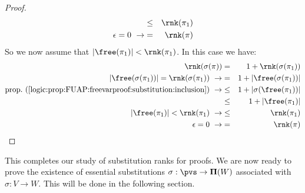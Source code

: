 \begin{proof}
\begin{eqnarray*}
    &\leq&\rnk(\pi_{1})\\
    \epsilon=0\ \rightarrow&=&\rnk(\pi)
    \end{eqnarray*}
So we now assume that $|\free(\pi_{1})|<\rnk(\pi_{1})$. In this case
we have:
    \begin{eqnarray*}
    \rnk(\sigma(\pi))&=&1+\rnk(\sigma(\pi_{1}))\\
    |\free(\sigma(\pi_{1}))|=\rnk(\sigma(\pi_{1}))\ \rightarrow
    &=&1+|\free(\sigma(\pi_{1}))|\\
    \mbox{prop.~(\ref{logic:prop:FUAP:freevarproof:substitution:inclusion})}\ \rightarrow
    &\leq&1+|\sigma(\free(\pi_{1}))|\\
    &\leq&1+|\free(\pi_{1})|\\
    |\free(\pi_{1})|<\rnk(\pi_{1})\ \rightarrow
    &\leq&\rnk(\pi_{1})\\
    \epsilon=0\ \rightarrow&=&\rnk(\pi)
    \end{eqnarray*}
\end{proof}

This completes our study of substitution ranks for proofs. We are
now ready to prove the existence of essential substitutions
$\sigma:\pvs\to{\bf \Pi}(W)$ associated with $\sigma:V\to W$. This
will be done in the following section.
